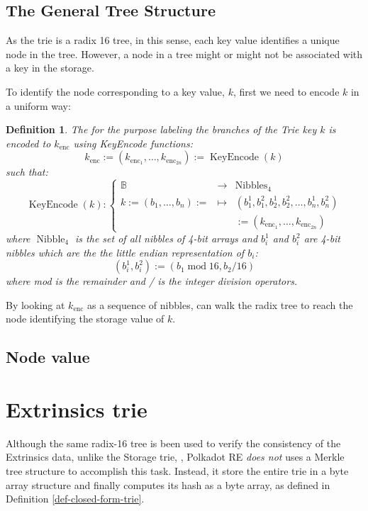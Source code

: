 \documentclass{article}
\newcommand{\assign}{:=}
\newcommand{\nosymbol}{}
\newcommand{\tmem}[1]{{\em #1\/}}
\newcommand{\tmop}[1]{\ensuremath{\operatorname{#1}}}
\newtheorem{definition}{Definition}
\begin{document}
\subsection{The General Tree Structure}

As the trie is a radix 16 tree, in this sense, each key value identifies a
unique node in the tree. However, a node in a tree might or might not be
associated with a key in the storage.

To identify the node corresponding to a key value, $k$, first we need to
encode $k$ in a uniform way:

\begin{definition}
  The for the purpose labeling the branches of the Trie key $k$ is encoded to
  $k_{\tmop{enc}}$ using KeyEncode functions:
  \begin{equation}
    k_{\tmop{enc}} \assign (k_{\tmop{enc}_1}, \ldots, k_{\tmop{enc}_{2 n}})
    \assign \tmop{KeyEncode} (k) \label{key-encode-in-trie}
  \end{equation}
  such that:
  \[ \tmop{KeyEncode} (k) : \left\{ \begin{array}{lll}
       \mathbb{B}^{\nosymbol} & \rightarrow & \tmop{Nibbles}_4\\
       k \assign (b_1, \ldots, b_n) \assign & \mapsto & (b^1_1, b^2_1, b_2^1,
       b^2_2, \ldots, b^1_n, b^2_n)\\
       &  & \assign (k_{\tmop{enc}_1}, \ldots, k_{\tmop{enc}_{2 n}})
     \end{array} \right. \]
  where $\tmop{Nibble}_4$ is the set of all nibbles of 4-bit arrays and
  $b^1_i$ and $b^2_i$ are 4-bit nibbles which are the the little endian
  representation of $b_i$:
  \[ (b^1_i, b^2_i) \assign (b_1 \tmop{mod} 16, b_2 / 16) \]
  where mod is the remainder and / is the integer division operators.
\end{definition}

By looking at $k_{\tmop{enc}}$ as a sequence of nibbles, can walk the radix
tree to reach the node identifying the storage value of $k$.

\subsection{Node value}

\section{Extrinsics trie}

Although the same radix-16 tree is been used to verify the consistency of the
Extrinsics data, unlike the Storage trie, , Polkadot RE {\tmem{does not}} uses
a Merkle tree structure to accomplish this task. Instead, it store the entire
trie in a byte array structure and finally computes its hash as a byte array,
as defined in Definition \ref{def-closed-form-trie}.
\end{document}
